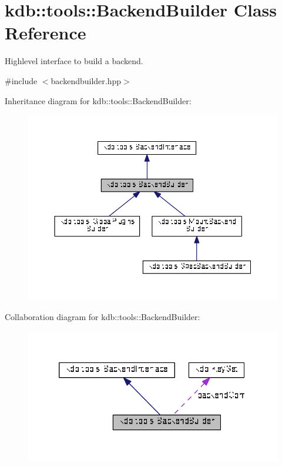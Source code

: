 \hypertarget{classkdb_1_1tools_1_1BackendBuilder}{}\section{kdb\+:\+:tools\+:\+:Backend\+Builder Class Reference}
\label{classkdb_1_1tools_1_1BackendBuilder}


Highlevel interface to build a backend.  




{\ttfamily \#include $<$backendbuilder.\+hpp$>$}



Inheritance diagram for kdb\+:\+:tools\+:\+:Backend\+Builder\+:
\nopagebreak
\begin{figure}[H]
\begin{center}
\leavevmode
\includegraphics[width=350pt]{classkdb_1_1tools_1_1BackendBuilder__inherit__graph}
\end{center}
\end{figure}


Collaboration diagram for kdb\+:\+:tools\+:\+:Backend\+Builder\+:
\nopagebreak
\begin{figure}[H]
\begin{center}
\leavevmode
\includegraphics[width=320pt]{classkdb_1_1tools_1_1BackendBuilder__coll__graph}
\end{center}
\end{figure}
